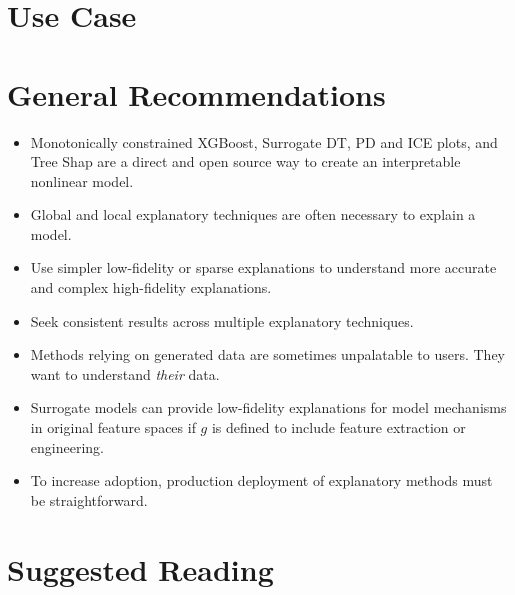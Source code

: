 \documentclass{article}
\begin{document}
\section{Use Case} \label{sec:use_case}


\section{General Recommendations} \label{sec:gen_rec}

\begin{itemize}
	
	\item Monotonically constrained XGBoost, Surrogate DT, PD and ICE plots, and Tree Shap are a direct and open source way to create an interpretable nonlinear model.
	
	\item Global and local explanatory techniques are often necessary to explain a model.
	
	\item Use simpler low-fidelity or sparse explanations to understand more accurate and complex high-fidelity explanations.  
	
	\item Seek consistent results across multiple explanatory techniques. 
	
	\item Methods relying on generated data are sometimes unpalatable to users. They want to understand \textit{their} data.
	
	\item Surrogate models can provide low-fidelity explanations for model mechanisms in original feature spaces if $g$ is defined to include feature extraction or engineering.
	
	\item To increase adoption, production deployment of explanatory methods must be straightforward.
	
\end{itemize}

\section{Suggested Reading} \label{sec:suggested}
\end{document}
